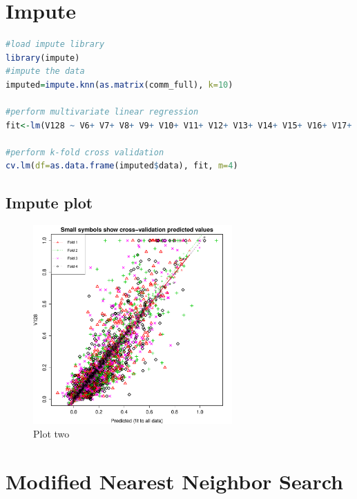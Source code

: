 \documentclass{article}
\begin{document}
\section{Impute}
\begin{lstlisting}[language=r]
#load impute library
library(impute)
#impute the data
imputed=impute.knn(as.matrix(comm_full), k=10)

#perform multivariate linear regression
fit<-lm(V128 ~ V6+ V7+ V8+ V9+ V10+ V11+ V12+ V13+ V14+ V15+ V16+ V17+ V18+ V19+ V20+ V21+ V22+ V23+ V24+ V25+ V26+ V27+ V28+ V29+ V30+ V32+ V33+ V34+ V35+ V36+ V37+ V38+ V39+ V40+ V41+ V42+ V43+ V44+ V45+ V46+ V47+ V48+ V49+ V50+ V51+ V52+ V53+ V54+ V55+ V56+ V57+ V58+ V59+ V60+ V61+ V62+ V63+ V64+ V65+ V66+ V67+ V68+ V69+ V70+ V71+ V72+ V73+ V74+ V75+ V76+ V77+ V78+ V79+ V80+ V81+ V82+ V83+ V84+ V85+ V86+ V87+ V88+ V89+ V90+ V91+ V92+ V93+ V94+ V95+ V96+ V97+ V98+ V99+ V100+ V101+ V119+ V120+ V121+ V126, data=as.data.frame(imputed$data))

#perform k-fold cross validation
cv.lm(df=as.data.frame(imputed$data), fit, m=4)
\end{lstlisting}

\subsection{Impute plot}
\begin{figure}[H]
\centering
\includegraphics[width=3.0in]{impute.pdf}
\caption{Plot two}\label{fig_container} 
\end{figure}

\section{Modified Nearest Neighbor Search}
\end{document}
